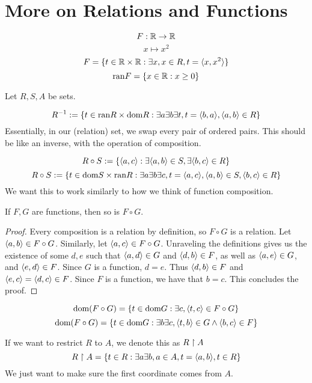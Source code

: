 
\section{More on Relations and Functions}
\begin{ex}
\[F: \mathbb{R} \to \mathbb{R}\]
\[x \mapsto x^2\]
\[F = \{t \in \mathbb{R} \times \mathbb{R}: \exists x, x \in R, t = \langle x, x^2\rangle \}\]
\[\text{ran} F = \{x \in \mathbb{R} : x \geq 0\}\]
\end{ex}
Let $R, S, A$ be sets.
\begin{defn}
\[R^{-1} := \{t \in \text{ran} R \times \text{dom} R: \exists a \exists b \exists t, t = \langle b, a\rangle, \langle a, b\rangle \in R\}\]
Essentially, in our (relation) set, we swap every pair of ordered pairs. This should be like an inverse, with the operation of composition.
\end{defn}
\begin{defn}
    \[R \circ S := \{\langle a, c\rangle: \exists \langle a, b\rangle \in S, \exists \langle b, c\rangle \in R\}\]
    \[R \circ S := \{t \in \text{dom} S \times \text{ran} R: \exists a \exists b \exists c, t = \langle a, c\rangle, \langle a, b\rangle \in S, \langle b, c\rangle \in R\}\]
    We want this to work similarly to how we think of function composition.
\end{defn}
\begin{prop}
If $F, G$ are functions, then so is $F \circ G$. 
\end{prop}
\begin{proof}
Every composition is a relation by definition, so $F \circ G$ is a relation. Let $\langle a, b\rangle \in F \circ G$. Similarly,
let $\langle a, c\rangle \in F \circ G$. Unraveling the definitions gives us the existence of some $d, e$ such that $\langle a, d\rangle \in G$
and $\langle d, b\rangle \in F$, as well as $\langle a, e\rangle \in G$, and $\langle e, d\rangle \in F$. Since $G $ is a function,  $d = e$. Thus $\langle d, b\rangle \in F$ and 
$\langle e, c\rangle = \langle d, c\rangle \in F$. Since $F$ is a function, we have that $b = c$. This concludes the proof.
\end{proof}
\begin{rem}
\[\text{dom} (F \circ G) = \{t \in \text{dom} G: \exists c, \langle t, c\rangle \in F \circ G\}\]
\[\text{dom} (F \circ G) = \{t \in \text{dom} G: \exists b \exists c, \langle t, b\rangle \in G \wedge \langle b, c\rangle \in F\}\]
\end{rem}
\begin{defn}
If we want to restrict $R$ to $A$, we denote this as $R \upharpoonright A$
\[R \upharpoonright A = \{t \in R: \exists a \exists b, a \in A, t = \langle a, b\rangle, t \in R\}\]
We just want to make sure the first coordinate comes from $A$.
\end{defn}
